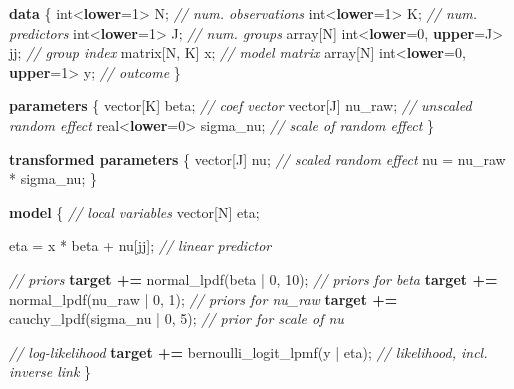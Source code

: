 \documentclass[
  11pt,
]{article}
\newenvironment{Shaded}{\begin{snugshade}}{\end{snugshade}}
\newcommand{\CommentTok}[1]{\textcolor[rgb]{0.56,0.35,0.01}{\textit{#1}}}
\newcommand{\DataTypeTok}[1]{\textcolor[rgb]{0.13,0.29,0.53}{#1}}
\newcommand{\DecValTok}[1]{\textcolor[rgb]{0.00,0.00,0.81}{#1}}
\newcommand{\KeywordTok}[1]{\textcolor[rgb]{0.13,0.29,0.53}{\textbf{#1}}}
\newcommand{\NormalTok}[1]{#1}
\begin{document}
\begin{Shaded}
\begin{Highlighting}[]
\KeywordTok{data}\NormalTok{ \{}
  \DataTypeTok{int}\NormalTok{\textless{}}\KeywordTok{lower}\NormalTok{=}\DecValTok{1}\NormalTok{\textgreater{} N;                    }\CommentTok{// num. observations}
  \DataTypeTok{int}\NormalTok{\textless{}}\KeywordTok{lower}\NormalTok{=}\DecValTok{1}\NormalTok{\textgreater{} K;                    }\CommentTok{// num. predictors}
  \DataTypeTok{int}\NormalTok{\textless{}}\KeywordTok{lower}\NormalTok{=}\DecValTok{1}\NormalTok{\textgreater{} J;                    }\CommentTok{// num. groups}
  \DataTypeTok{array}\NormalTok{[N] }\DataTypeTok{int}\NormalTok{\textless{}}\KeywordTok{lower}\NormalTok{=}\DecValTok{0}\NormalTok{, }\KeywordTok{upper}\NormalTok{=J\textgreater{} jj; }\CommentTok{// group index}
  \DataTypeTok{matrix}\NormalTok{[N, K] x;                    }\CommentTok{// model matrix}
  \DataTypeTok{array}\NormalTok{[N] }\DataTypeTok{int}\NormalTok{\textless{}}\KeywordTok{lower}\NormalTok{=}\DecValTok{0}\NormalTok{, }\KeywordTok{upper}\NormalTok{=}\DecValTok{1}\NormalTok{\textgreater{} y;  }\CommentTok{// outcome}
\NormalTok{\}}

\KeywordTok{parameters}\NormalTok{ \{}
  \DataTypeTok{vector}\NormalTok{[K] beta;          }\CommentTok{// coef vector}
  \DataTypeTok{vector}\NormalTok{[J] nu\_raw;        }\CommentTok{// unscaled random effect}
  \DataTypeTok{real}\NormalTok{\textless{}}\KeywordTok{lower}\NormalTok{=}\DecValTok{0}\NormalTok{\textgreater{} sigma\_nu;  }\CommentTok{// scale of random effect}
\NormalTok{\}}

\KeywordTok{transformed parameters}\NormalTok{ \{}
  \DataTypeTok{vector}\NormalTok{[J] nu;            }\CommentTok{// scaled random effect}
\NormalTok{  nu = nu\_raw * sigma\_nu;}
\NormalTok{\}}

\KeywordTok{model}\NormalTok{ \{}
  \CommentTok{// local variables}
  \DataTypeTok{vector}\NormalTok{[N] eta;}
  
\NormalTok{  eta = x * beta + nu[jj];                  }\CommentTok{// linear predictor}

  \CommentTok{// priors}
  \KeywordTok{target +=}\NormalTok{ normal\_lpdf(beta | }\DecValTok{0}\NormalTok{, }\DecValTok{10}\NormalTok{);      }\CommentTok{// priors for beta}
  \KeywordTok{target +=}\NormalTok{ normal\_lpdf(nu\_raw | }\DecValTok{0}\NormalTok{, }\DecValTok{1}\NormalTok{);     }\CommentTok{// priors for nu\_raw}
  \KeywordTok{target +=}\NormalTok{ cauchy\_lpdf(sigma\_nu | }\DecValTok{0}\NormalTok{, }\DecValTok{5}\NormalTok{);   }\CommentTok{// prior for scale of nu}

  \CommentTok{// log{-}likelihood}
  \KeywordTok{target +=}\NormalTok{ bernoulli\_logit\_lpmf(y | eta); }\CommentTok{// likelihood, incl. inverse link}
\NormalTok{\}}
\end{Highlighting}
\end{Shaded}
\end{document}
